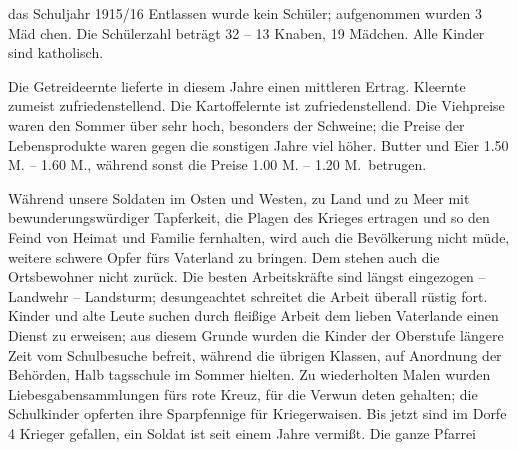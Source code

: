 

das Schuljahr 1915/16\ob
Entlassen wurde kein Schüler; aufgenommen wurden 3 Mäd\ohb
chen. Die Schülerzahl beträgt 32 – 13 Knaben, 19 Mädchen. Alle\ob
Kinder sind katholisch.

\pend
{}
\pstart

Die Getreideernte lieferte in diesem Jahre einen mittleren Ertrag. Kleernte\ob
zumeist zufriedenstellend. Die Kartoffelernte ist zufriedenstellend.\ob
Die Viehpreise waren den Sommer über sehr hoch, besonders der\ob
Schweine; die Preise der Lebensprodukte waren gegen die sonstigen\ob
Jahre viel höher. Butter und Eier 1.50 M. – 1.60 M., während sonst die\ob
Preise 1.00 M. – 1.20 M.\ betrugen.

\pend
{}
\pstart

Während unsere Soldaten im Osten und Westen, zu Land und\ob
zu Meer mit bewunderungswürdiger Tapferkeit, die Plagen\ob
des Krieges ertragen und so den Feind von Heimat und Familie\ob
fernhalten, wird auch die Bevölkerung nicht müde, weitere\ob
schwere Opfer fürs Vaterland zu bringen. Dem stehen auch\ob
die Ortsbewohner nicht zurück. Die besten Arbeitskräfte sind\ob
längst eingezogen – Landwehr – Landsturm; desungeachtet schreitet\ob
die Arbeit überall rüstig fort. Kinder und alte Leute\ob
suchen durch fleißige Arbeit dem lieben Vaterlande einen\ob
Dienst zu erweisen; aus diesem Grunde wurden die Kinder\ob
der Oberstufe längere Zeit vom Schulbesuche befreit, während\ob
die übrigen Klassen, auf Anordnung der Behörden, Halb\ohb
tagsschule im Sommer hielten.\ob
Zu wiederholten Malen wurden Liebesgabensammlungen fürs rote Kreuz, für die Verwun\ohb
deten gehalten; die Schulkinder opferten ihre Sparpfennige\ob
für Kriegerwaisen. Bis jetzt sind im Dorfe 4 Krieger gefallen,\ob
ein Soldat ist seit einem Jahre vermißt. Die ganze Pfarrei
\pend
